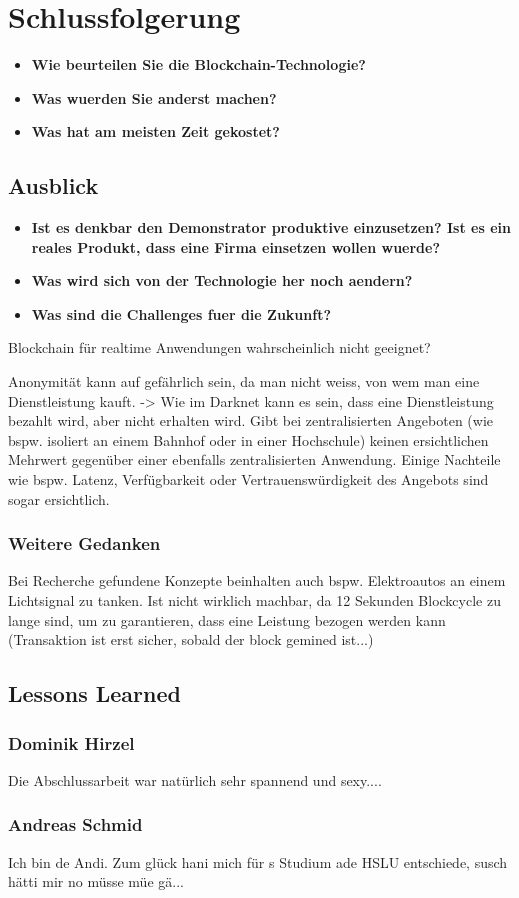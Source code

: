 \chapter{Schlussfolgerung}
\label{cha:Schlussfolgerung}
\begin{itemize}
    \item \textbf{Wie beurteilen Sie die Blockchain-Technologie?}
    \item \textbf{Was wuerden Sie anderst machen?}
    \item \textbf{Was hat am meisten Zeit gekostet?}
\end{itemize}

\section{Ausblick}
\label{sec:Ausblick}
\begin{itemize}
    \item \textbf{Ist es denkbar den Demonstrator produktive einzusetzen? Ist es ein reales Produkt, dass eine Firma einsetzen wollen wuerde?}
    \item \textbf{Was wird sich von der Technologie her noch aendern?}
    \item \textbf{Was sind die Challenges fuer die Zukunft?}
\end{itemize}
Blockchain für realtime Anwendungen wahrscheinlich nicht geeignet?
\par
Anonymität kann auf gefährlich sein, da man nicht weiss, von wem man eine Dienstleistung kauft. -> Wie im Darknet kann es sein, dass eine Dienstleistung bezahlt wird, aber nicht erhalten wird.
Gibt bei zentralisierten Angeboten (wie bspw. isoliert an einem Bahnhof oder in einer Hochschule) keinen ersichtlichen Mehrwert gegenüber einer ebenfalls zentralisierten Anwendung. Einige Nachteile wie bspw. Latenz, Verfügbarkeit oder Vertrauenswürdigkeit des Angebots sind sogar ersichtlich.

\subsection{Weitere Gedanken}
Bei Recherche gefundene Konzepte beinhalten auch bspw. Elektroautos an einem Lichtsignal zu tanken. Ist nicht wirklich machbar, da 12 Sekunden Blockcycle zu lange sind, um zu garantieren, dass eine Leistung bezogen werden kann (Transaktion ist erst sicher, sobald der block gemined ist...)



\section{Lessons Learned}
\label{sec:Lessons_Learned}

\subsection{Dominik Hirzel}
Die Abschlussarbeit war natürlich sehr spannend und sexy....

\subsection{Andreas Schmid}
Ich bin de Andi. Zum glück hani mich für s Studium ade HSLU entschiede, susch hätti mir no müsse müe gä...
